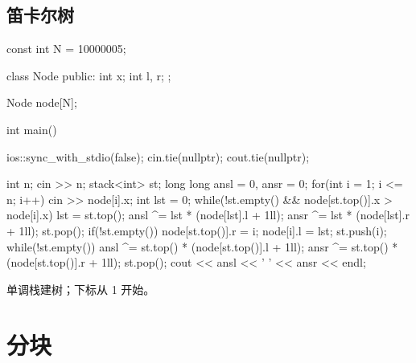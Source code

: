 \section{笛卡尔树}
\begin{codeline}
const int N = 10000005;

class Node {
public:
    int x;
    int l, r;
};

Node node[N];

int main() {
    ios::sync_with_stdio(false);
    cin.tie(nullptr);
    cout.tie(nullptr);

    int n;
    cin >> n;
    stack<int> st;
    long long ansl = 0, ansr = 0;
    for(int i = 1; i <= n; i++) {
        cin >> node[i].x;
        int lst = 0;
        while(!st.empty() && node[st.top()].x > node[i].x) {
            lst = st.top();
            ansl ^= lst * (node[lst].l + 1ll);
            ansr ^= lst * (node[lst].r + 1ll);
            st.pop();
        }
        if(!st.empty()) {
            node[st.top()].r = i;
        }
        node[i].l = lst;
        st.push(i);
    }
    while(!st.empty()) {
        ansl ^= st.top() * (node[st.top()].l + 1ll);
        ansr ^= st.top() * (node[st.top()].r + 1ll);
        st.pop();
    }
    cout << ansl << ' ' << ansr << endl;
}
\end{codeline}
\begin{warnbox}
单调栈建树；下标从 1 开始。
\end{warnbox}


\chapter{分块}

